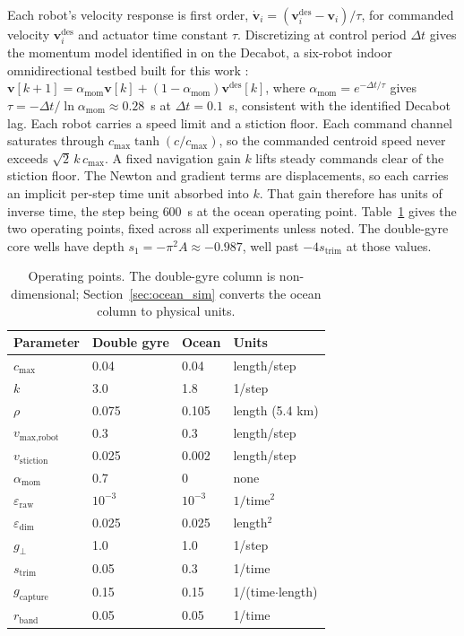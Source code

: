 \documentclass[lettersize,journal]{IEEEtran}
\begin{document}
Each robot's velocity response is first order, $\dot{\mathbf{v}}_i =
(\mathbf{v}_i^{\text{des}} - \mathbf{v}_i)/\tau$, for commanded velocity
$\mathbf{v}_i^{\text{des}}$ and actuator time constant $\tau$.
Discretizing at control period $\Delta t$
gives the momentum model identified in \cite{8} on the Decabot, a
six-robot indoor omnidirectional testbed built for this work
\cite{33,34}:
$\mathbf{v}[k+1] = \alpha_{\text{mom}}\mathbf{v}[k] + (1 -
\alpha_{\text{mom}})\mathbf{v}^{\text{des}}[k]$,
where $\alpha_{\text{mom}} = e^{-\Delta t/\tau}$ gives $\tau = -\Delta
t/\ln\alpha_{\text{mom}} \approx 0.28$~s at $\Delta t = 0.1$~s,
consistent with the identified Decabot lag. Each robot carries a speed limit and a stiction floor.
Each command channel saturates through $c_{\max}\tanh(c/c_{\max})$, so
the commanded centroid speed never exceeds $\sqrt{2}\,k\,c_{\max}$. A
fixed navigation gain $k$ lifts steady commands clear of the stiction
floor. The Newton and gradient terms are displacements, so each carries an implicit per-step time unit absorbed into $k$. That gain therefore has units of inverse time, the step being $600$~s at the ocean operating point. Table~\ref{tab:params}
gives the two operating points, fixed across all experiments unless
noted. The double-gyre core wells have depth $s_1 = -\pi^2 A \approx
-0.987$, well past $-4s_{\mathrm{trim}}$ at those values.

\begin{table}[!t]
\caption{Operating points. The double-gyre column is non-dimensional;
Section~\ref{sec:ocean_sim} converts the ocean column to physical units.}
\label{tab:params}
\centering
\begin{tabular}{llll}
\hline
Parameter & Double gyre & Ocean & Units \\
\hline
$c_{\max}$              & 0.04  & 0.04   & length/step \\
$k$                     & 3.0   & 1.8    & 1/step \\
$\rho$                  & 0.075 & 0.105  & length (5.4 km) \\
$v_{\text{max,robot}}$  & 0.3   & 0.3    & length/step \\
$v_{\text{stiction}}$   & 0.025 & 0.002  & length/step \\
$\alpha_{\text{mom}}$   & 0.7   & 0      & none \\
$\varepsilon_{\text{raw}}$ & $10^{-3}$ & $10^{-3}$ & $1/\text{time}^2$ \\
$\varepsilon_{\dim}$    & 0.025 & 0.025  & length$^2$ \\
$g_\perp$               & 1.0   & 1.0    & 1/step \\
$s_{\mathrm{trim}}$     & 0.05  & 0.3    & 1/time \\
$g_{\text{capture}}$    & 0.15  & 0.15   & 1/(time$\cdot$length) \\
$r_{\text{band}}$       & 0.05  & 0.05   & 1/time \\
\hline
\end{tabular}
\end{table}
\end{document}
